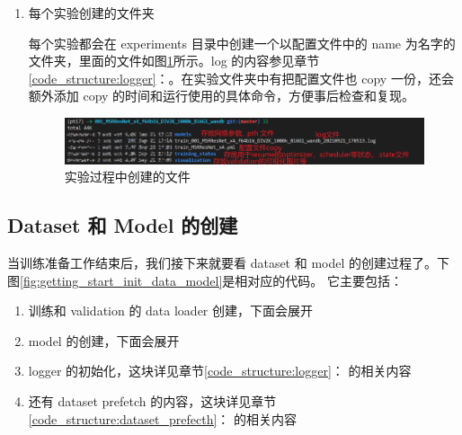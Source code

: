 \documentclass[../main.tex]{subfiles}
\begin{document}
\begin{enumerate}
    \item 每个实验创建的文件夹

          每个实验都会在 experiments 目录中创建一个以配置文件中的 name 为名字的文件夹，里面的文件如图\ref{fig:getting_start_exp_folder}所示。log 的内容参见章节\ref{code_structure:logger}：。在实验文件夹中有把配置文件也 copy 一份，还会额外添加 copy 的时间和运行使用的具体命令，方便事后检查和复现。

          \begin{figure}[h]
              \begin{center}
                  \vspace{-0.2cm}
                  \includegraphics[width=0.85\linewidth]{figures/getting_start_exp_folder.png}
                  \vspace{-0.3cm}
                  \caption{实验过程中创建的文件}
                  \label{fig:getting_start_exp_folder}
              \end{center}
              \vspace{-0.5cm}
          \end{figure}
\end{enumerate}

\subsection{Dataset 和 Model 的创建}\label{getting_start:data_model_creation}

当训练准备工作结束后，我们接下来就要看 dataset 和 model 的创建过程了。下图\ref{fig:getting_start_init_data_model}是相对应的代码。
它主要包括：
\begin{enumerate}
    \item 训练和 validation 的 data loader 创建，下面会展开
    \item model 的创建，下面会展开
    \item logger 的初始化，这块详见章节\ref{code_structure:logger}： 的相关内容
    \item 还有 dataset prefetch 的内容，这块详见章节\ref{code_structure:dataset_prefecth}： 的相关内容
\end{enumerate}
\end{document}
